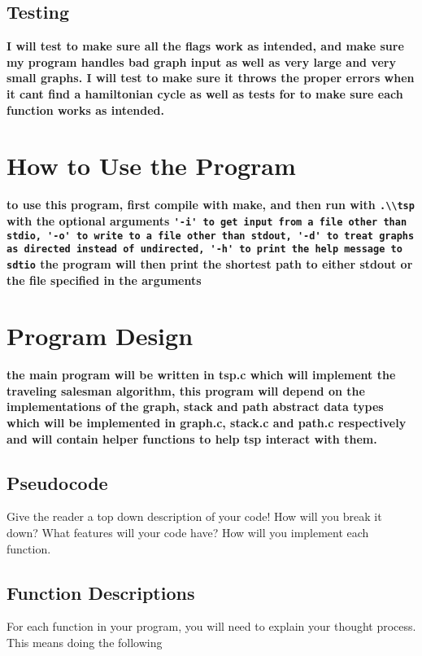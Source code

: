 \documentclass{article}
\begin{document}
\subsection*{Testing}

\textbf{I will test to make sure all the flags work as intended, and make sure my program handles bad graph input as well as very large and very small graphs. I will test to make sure it throws the proper errors when it cant find a hamiltonian cycle as well as tests for to make sure each function works as intended.}

\section*{How to Use the Program}

\textbf{to use this program, first compile with make, and then run with \lstinline{.\\tsp} with the optional arguments \lstinline{'-i' to get input from a file other than stdio, '-o' to write to a file other than stdout, '-d' to treat graphs as directed instead of undirected, '-h' to print the help message to sdtio} the program will then print the shortest path to either stdout or the file specified in the arguments}

\section*{Program Design}

\textbf{the main program will be written in tsp.c which will implement the traveling salesman algorithm, this program will depend on the implementations of the graph, stack and path abstract data types which will be implemented in graph.c, stack.c and path.c respectively and will contain helper functions to help tsp interact with them.}

\subsection*{Pseudocode}
Give the reader a top down description of your code! How will you break it down? What features will your code have? 
How will you implement each function. 

\subsection*{Function Descriptions}
For each function in your program, you will need to explain your thought process. This means doing the following
\end{document}
